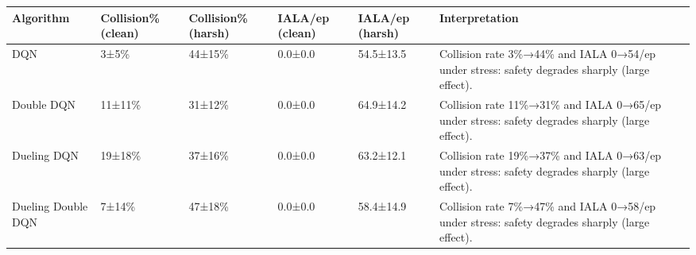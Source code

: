 \begin{tabular}{llllll}
\toprule
Algorithm & Collision\% (clean) & Collision\% (harsh) & IALA/ep (clean) & IALA/ep (harsh) & Interpretation \\
\midrule
DQN & 3±5\% & 44±15\% & 0.0±0.0 & 54.5±13.5 & Collision rate 3\%→44\% and IALA 0→54/ep under stress: safety degrades sharply (large effect). \\
Double DQN & 11±11\% & 31±12\% & 0.0±0.0 & 64.9±14.2 & Collision rate 11\%→31\% and IALA 0→65/ep under stress: safety degrades sharply (large effect). \\
Dueling DQN & 19±18\% & 37±16\% & 0.0±0.0 & 63.2±12.1 & Collision rate 19\%→37\% and IALA 0→63/ep under stress: safety degrades sharply (large effect). \\
Dueling Double DQN & 7±14\% & 47±18\% & 0.0±0.0 & 58.4±14.9 & Collision rate 7\%→47\% and IALA 0→58/ep under stress: safety degrades sharply (large effect). \\
\bottomrule
\end{tabular}
